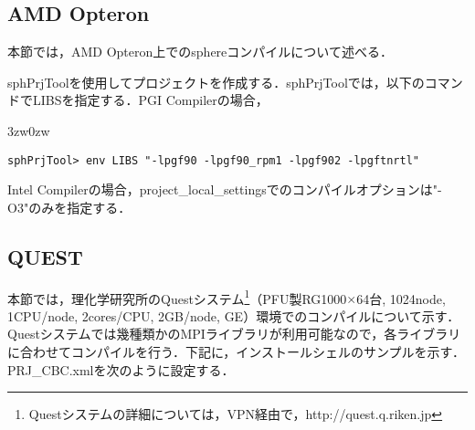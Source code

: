 %
\subsection{AMD Opteron}
本節では，AMD Opteron上でのsphereコンパイルについて述べる．

sphPrjToolを使用してプロジェクトを作成する．sphPrjToolでは，以下のコマンドでLIBSを指定する．PGI Compilerの場合，\\

\begin{indentation}{3zw}{0zw}
\small
\begin{verbatim}
sphPrjTool> env LIBS "-lpgf90 -lpgf90_rpm1 -lpgf902 -lpgftnrtl"
\end{verbatim}
\end{indentation}

Intel Compilerの場合，project\_local\_settingsでのコンパイルオプションは"-O3"のみを指定する．


%
\subsection{QUEST}
\label{sec:install_quest}
本節では，理化学研究所のQuestシステム\footnote{Questシステムの詳細については，VPN経由で，http://quest.q.riken.jp}（PFU製RG1000$\times$64台, 1024node, 1CPU/node, 2cores/CPU, 2GB/node, GE）環境でのコンパイルについて示す．
Questシステムでは幾種類かのMPIライブラリが利用可能なので，各ライブラリに合わせてコンパイルを行う．下記に，インストールシェルのサンプルを示す．
PRJ\_CBC.xmlを次のように設定する．

